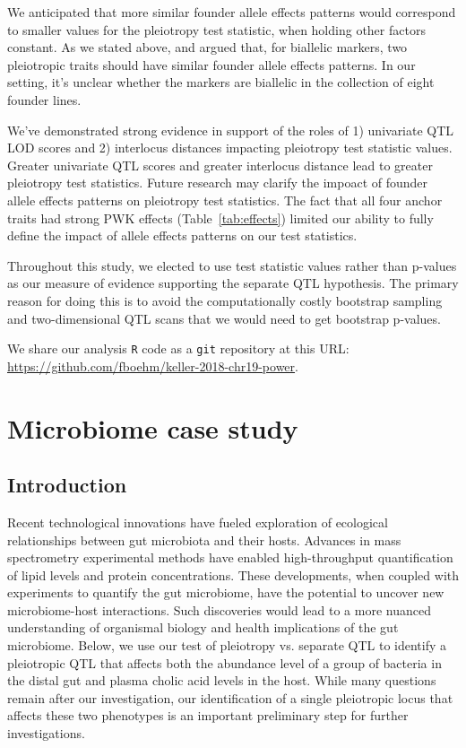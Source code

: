 \documentclass[oneside]{book}
\begin{document}
We anticipated that more similar founder allele effects patterns would correspond to smaller values for the pleiotropy test statistic, when holding other factors constant. As we stated above, \citet{macdonald2007joint} and \citet{king2012genetic} argued that, for biallelic markers, two pleiotropic traits should have similar founder allele effects patterns. In our setting, it's unclear whether the markers are biallelic in the collection of eight founder lines.

We've demonstrated strong evidence in support of the roles of 1) univariate QTL LOD scores and 2) interlocus distances impacting pleiotropy test statistic values. Greater univariate QTL scores and greater interlocus distance lead to greater pleiotropy test statistics. Future research may clarify the impoact of founder allele effects patterns on pleiotropy test statistics. The fact that all four anchor traits had strong PWK effects (Table~\ref{tab:effects}) limited our ability to fully define the impact of allele effects patterns on our test statistics.

Throughout this study, we elected to use test statistic values rather than p-values as our measure of evidence supporting the separate QTL hypothesis. The primary reason for doing this is to avoid the computationally costly bootstrap sampling and two-dimensional QTL scans that we would need to get bootstrap p-values.

We share our analysis \texttt{R} code \citep{r} as a \texttt{git} repository at this URL: \url{https://github.com/fboehm/keller-2018-chr19-power}.




\section{Microbiome case study}
\subsection{Introduction}

Recent technological innovations have fueled exploration of ecological relationships between gut microbiota and their hosts. Advances in mass spectrometry experimental methods have enabled high-throughput quantification of lipid levels and protein concentrations. These developments, when coupled with experiments to quantify the gut microbiome, have the potential to uncover new microbiome-host interactions. Such discoveries would lead to a more nuanced understanding of organismal biology and health implications of the gut microbiome. Below, we use our test of pleiotropy vs. separate QTL to identify a pleiotropic QTL that affects both the abundance level of a group of bacteria in the distal gut and plasma cholic acid levels in the host. While many questions remain after our investigation, our identification of a single pleiotropic locus that affects these two phenotypes is an important preliminary step for further investigations.  
\end{document}
